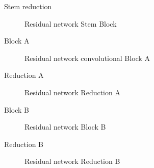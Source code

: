 
\begin{frame}{Stem reduction}
  \begin{figure}
    \centering
    \scalebox{1.}{}
    \caption{Residual network Stem Block \label{fig:residual-block-stem}}
  \end{figure}
\end{frame}

\begin{frame}{Block A}
  \begin{figure}
    \centering
    \scalebox{.6}{}
    \caption{Residual network convolutional Block A \label{fig:residual-block-a}}
  \end{figure}
\end{frame}

\begin{frame}{Reduction A}
  \begin{figure}
    \centering
    \scalebox{.85}{}
    \caption{Residual network Reduction A \label{fig:residual-block-reduce-a}}
  \end{figure}
\end{frame}

\begin{frame}{Block B}
  \begin{figure}
    \centering
    \scalebox{.5}{}
    \caption{Residual network Block B \label{fig:residual-block-b}}
  \end{figure}
\end{frame}

\begin{frame}{Reduction B}
  \begin{figure}
    \centering
    \scalebox{.9}{}
    \caption{Residual network Reduction B \label{fig:residual-block-reduce-b}}
  \end{figure}
\end{frame}
